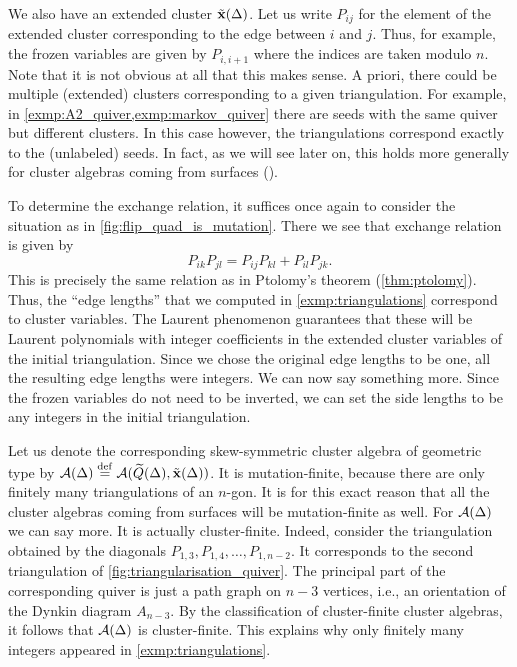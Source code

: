 \begin{example}
	We also have an extended cluster $\tilde{\mathbf{x}}(\Delta)$. Let us write $P_{ij}$ for the element
	of the extended cluster corresponding to the edge between $i$ and $j$. Thus, for
	example, the frozen variables are given by $P_{i, i+1}$ where the indices are taken
	modulo $n$. Note that it is not obvious at all that this makes sense. A priori, there
	could be multiple (extended) clusters corresponding to a given triangulation. For
	example, in \cref{exmp:A2_quiver,exmp:markov_quiver} there are seeds with the same
	quiver but different clusters. In this case however, the triangulations correspond
	exactly to the (unlabeled) seeds. In fact, as we will see later on, this holds more
	generally for cluster algebras coming from surfaces (\cite[Theorem
		7.11]{FominShapiroThurston2008CATriangulatedSurfacesI}).

	To determine the exchange relation, it suffices once again to consider the situation as
	in \cref{fig:flip_quad_is_mutation}. There we see that exchange relation is given by
	\begin{equation}\label{eq:exchange_flip_quad}
		P_{ik}P_{jl} = P_{ij}P_{kl} + P_{il}P_{jk}.
	\end{equation}
	This is precisely the same relation as in Ptolomy's theorem (\cref{thm:ptolomy}). Thus,
	the ``edge lengths'' that we computed in \cref{exmp:triangulations} correspond to
	cluster variables. The Laurent phenomenon guarantees that these will be Laurent
	polynomials with integer coefficients in the extended cluster variables of the initial
	triangulation. Since we chose the original edge lengths to be one, all the resulting
	edge lengths were integers. We can now say something more. Since the frozen variables
	do not need to be inverted, we can set the side lengths to be any integers in the
	initial triangulation.

	Let us denote the corresponding skew-symmetric cluster algebra of geometric type by
	$\mathcal{A}(\Delta) \overset{\mathrm{def}}{=} \mathcal{A}(\widetilde{Q}(\Delta), \tilde{\mathbf{x}}(\Delta))$. It is mutation-finite, because
	there are only finitely many triangulations of an $n$-gon. It is for this exact reason
	that all the cluster algebras coming from surfaces will be mutation-finite as well. For
	$\mathcal{A}(\Delta)$ we can say more. It is actually cluster-finite. Indeed, consider the
	triangulation obtained by the diagonals $P_{1, 3}, P_{1,4}, \dots, P_{1,n-2}$. It
	corresponds to the second triangulation of \cref{fig:triangularisation_quiver}. The
	principal part of the corresponding quiver is just a path graph on $n-3$ vertices,
	i.e., an orientation of the Dynkin diagram $A_{n-3}$. By the classification of
	cluster-finite cluster algebras, it follows that $\mathcal{A}(\Delta)$ is cluster-finite. This
	explains why only finitely many integers appeared in \cref{exmp:triangulations}.


\end{example}
